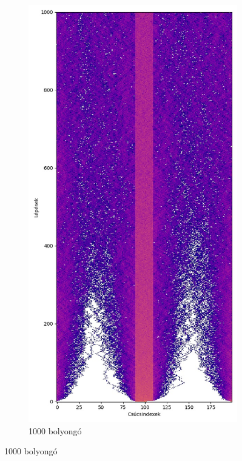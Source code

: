\begin{figure}[H]
\begin{subfigure}{.45\linewidth}
  \end{subfigure}
  \begin{subfigure}{.45\linewidth}
    \centering
    \includegraphics[width=\linewidth]{./figures/sulyzo/sim03.jpg}
    \caption{1000 bolyongó}
  \end{subfigure}
\end{figure}


